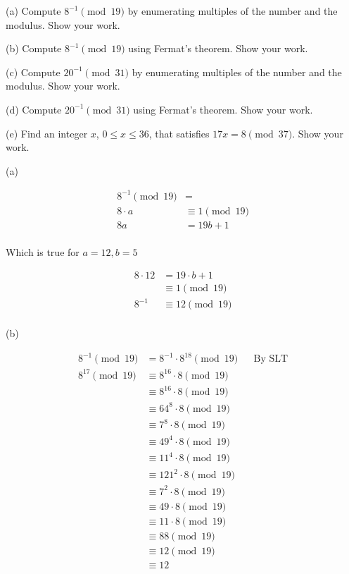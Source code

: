 
\begin{problem}
(a) Compute $8^{-1}\pmod{19}$ by enumerating multiples of the number and the modulus.
Show your work.

\smallskip\noindent
(b) Compute $8^{-1}\pmod{19}$ using Fermat's theorem. Show your work.

\smallskip\noindent
(c) Compute $20^{-1}\pmod{31}$ by enumerating multiples of the number and the modulus.
Show your work.

\smallskip\noindent
(d) Compute $20^{-1}\pmod{31}$ using Fermat's theorem. Show your work.

\smallskip\noindent
(e) Find an integer $x$, $0\le x \le 36$, that satisfies
$17x = 8 \pmod{37}$. Show your work.
\end{problem}

\begin{solution}
(a)

\begin{align*}
8^{-1}\pmod{19} &= \\
8 \cdot a &\equiv 1\pmod{19} \\
8a &= 19b + 1 \\
\end{align*}

Which is true for $a=12 , b=5$

\begin{align*}
8 \cdot 12 &= 19 \cdot b + 1 \\
&\equiv 1\pmod{19} \\
8^{-1} &\equiv 12\pmod{19} \\
\end{align*}


(b)

\begin{align*}
8^{-1} \pmod{19} &= 8^{-1} \cdot 8^{18} \pmod{19} && \text{By SLT} \\
8^{17} \pmod{19} &\equiv 8^{16} \cdot 8 \pmod{19} \\
&\equiv 8^{16} \cdot 8 \pmod{19} \\
&\equiv 64^{8} \cdot 8 \pmod{19} \\
&\equiv 7^{8} \cdot 8 \pmod{19} \\
&\equiv 49^{4} \cdot 8 \pmod{19} \\
&\equiv 11^{4} \cdot 8 \pmod{19} \\
&\equiv 121^{2} \cdot 8 \pmod{19} \\
&\equiv 7^{2} \cdot 8 \pmod{19} \\
&\equiv 49 \cdot 8 \pmod{19} \\
&\equiv 11 \cdot 8 \pmod{19} \\
&\equiv 88 \pmod{19} \\
&\equiv 12 \pmod{19} \\
&\equiv 12 
\end{align*}


\end{solution}
